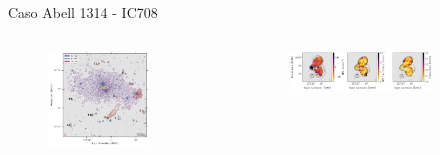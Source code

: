 \documentclass[xetex,aspectratio=169]{beamer}
\begin{document}
	\begin{frame}{Caso Abell 1314 - IC708}
		
		\begin{columns}
			\begin{column}{0.48\textwidth}
				\begin{figure}
					\centering
					\includegraphics[width=\textwidth, keepaspectratio]{figures/a1314/plot_overlay.pdf}
				\end{figure}
			\end{column}
			
			\begin{column}{0.48\textwidth}
				\begin{figure}
					\centering
					\begin{subfigure}{\textwidth}
						\centering
						\includegraphics[width=\textwidth, keepaspectratio]{figures/a1314/sources/3/plot_rm.pdf}
					\end{subfigure}
					

\end{figure}
\end{column}
\end{columns}
\end{frame}
\end{document}
